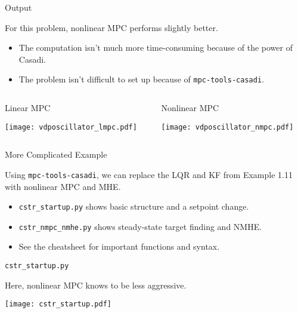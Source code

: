 \documentclass[xcolor=dvipsnames]{beamer}
\begin{document}
\begin{frame}{Output}

For this problem, nonlinear MPC performs slightly better.
\begin{itemize}
    \item The computation isn't much more time-consuming because of the power of Casadi.
    \item The problem isn't difficult to set up because of \texttt{mpc-tools-casadi}.
\end{itemize}
    
\begin{columns}
    \begin{column}{.475\textwidth}
        \begin{block}{Linear MPC}
            \begin{center}
                \texttt{[image: vdposcillator\_lmpc.pdf]}
            \end{center}
        \end{block}
    \end{column}
    \begin{column}{.475\textwidth}
        \begin{block}{Nonlinear MPC}
            \begin{center}
                \texttt{[image: vdposcillator\_nmpc.pdf]}
            \end{center}
        \end{block}
    \end{column}
\end{columns}
\end{frame}

\begin{frame}{More Complicated Example}

Using \texttt{mpc-tools-casadi}, we can replace the LQR and KF from Example 1.11 with nonlinear MPC and MHE.

\begin{itemize}
    \item \texttt{cstr\_startup.py} shows basic structure and a setpoint change.
    \item \texttt{cstr\_nmpc\_nmhe.py} shows steady-state target finding and NMHE.
    \item See the cheatsheet for important functions and syntax.
\end{itemize}

\end{frame}

\begin{frame}{\texttt{cstr\_startup.py}}
    
    Here, nonlinear MPC knows to be less aggressive.
    \begin{center}
        \texttt{[image: cstr\_startup.pdf]}
     \end{center}
\end{frame}
\end{document}
